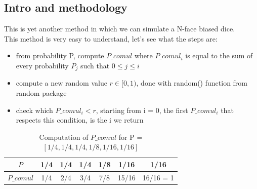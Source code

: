 \documentclass[a4paper]{article}
\begin{document}
\subsection*{Intro and methodology}
This is yet another method in which we can simulate a N-face biased dice.\\
This method is very easy to understand, let's see what the steps are:
\begin{itemize}
\item [(1)] from probability P, compute $P\_comul$ where $P\_comul_{i}$ is equal to the sum of every probability $P_{j}$ such that $0 \leq j \leq i$
\item [(2)] compute a new random value $r \in [0,1)$, done with random() function from random package
\item [(3)] check which $P\_comul_{i} < r$, starting from i = 0, the first $P\_comul_{i}$ that respects this condition, is the i we return
\end{itemize}

\begin{table}[H]
\begin{center}
\begin{tabular}{|c|c|c|c|c|c|c|}
\hline
$P$        & 1/4 & 1/4 & 1/4 & 1/8   & 1/16      & 1/16      \\ \hline
$P\_comul$ & 1/4 & 2/4 & 3/4 & 7/8 & 15/16 & 16/16 = 1 \\ \hline
\end{tabular}
\caption*{\label{BD} Computation of $P\_comul$ for P = $[ 1/4, 1/4, 1/4, 1/8, 1/16, 1/16]$ }
\end{center}
\end{table}
\end{document}
